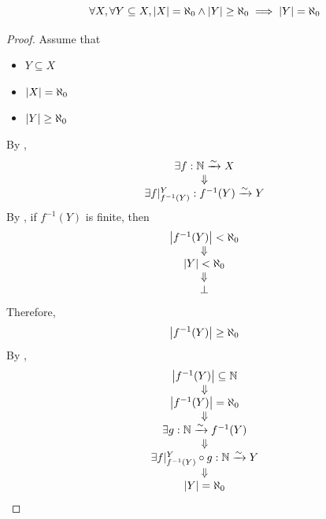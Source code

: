 \bigskip

\begin{theorem} \label{an:thm:infinite-subset-of-countable-set-is-countable}
    \[
    \forall X, \forall Y \subseteq X, \abs*{X} = \aleph_{0} \land \abs*{Y} \geq \aleph_{0} \implies \abs*{Y} = \aleph_{0}
    \]
\end{theorem}

\begin{proof}
    Assume that
    \begin{itemize}
        \item $Y \subseteq X$
        \item $\abs*{X} = \aleph_{0}$
        \item $\abs*{Y} \geq \aleph_{0}$
    \end{itemize}
    By ,
    \[
    \begin{array}{c}
        \exists f: \N \xrightarrow{\sim} X \\
        \Downarrow \\
        \exists f|_{f^{-1}(Y)}^{Y}: f^{-1}(Y) \xrightarrow{\sim} Y \\
    \end{array}
    \]
    By , if $f^{-1}(Y)$ is finite, then
    \[
    \begin{array}{c}
        \abs*{f^{-1}(Y)} < \aleph_{0} \\
        \Downarrow \\
        \abs*{Y} < \aleph_{0} \\
        \Downarrow \\
        \bot
    \end{array}
    \]
    Therefore,
    \[
    \abs*{f^{-1}(Y)} \geq \aleph_{0}
    \]
    By ,
    \[
    \begin{array}{c}
        \abs*{f^{-1}(Y)} \subseteq \N \\
        \Downarrow \\
        \abs*{f^{-1}(Y)} = \aleph_{0} \\
        \Downarrow \\
        \exists g: \N \xrightarrow{\sim} f^{-1}(Y) \\
        \Downarrow \\
        \exists f|_{f^{-1}(Y)}^{Y} \circ g: \N \xrightarrow{\sim} Y \\
        \Downarrow \\
        \abs*{Y} = \aleph_{0}
    \end{array}
    \]
\end{proof}

